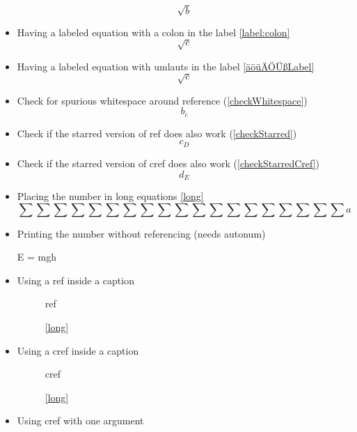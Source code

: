 \documentclass{article}
\begin{document}
\begin{itemize}
			\begin{equation}\label{äöüÄÖÜß?:, 3075µ!/§}
				\sqrt{b}
			\end{equation}
		\item Having a labeled equation with a colon in the label \ref{label:colon}
			\begin{equation}\label{label:colon}
				\sqrt{c}
			\end{equation}
		\item Having a labeled equation with umlauts in the label \ref{äöüÄÖÜßLabel}
			\begin{equation}\label{äöüÄÖÜßLabel}
				\sqrt{c}
			\end{equation}
		\item Check for spurious whitespace around reference (\ref{checkWhitespace})
			\begin{equation}\label{checkWhitespace}
				b_c
			\end{equation}
		\item Check if the starred version of ref does also work (\ref*{checkStarred})
			\begin{equation}\label{checkStarred}
				c_D
			\end{equation}
		\item Check if the starred version of cref does also work (\cref*{checkStarredCref})
			\begin{equation}\label{checkStarredCref}
				d_E
			\end{equation}
		\item Placing the number in long equations \ref{long}
			\begin{equation}\label{long}
				\sum\sum\sum\sum\sum\sum\sum\sum\sum\sum\sum\sum\sum\sum\sum\sum\sum\sum\sum a
			\end{equation}
		\item Printing the number without referencing (needs autonum)
			\begin{equation+}
				E = mgh
			\end{equation+}
		\item Using a ref inside a caption
			\begin{figure}
				ref
				\caption{\ref{long}}
			\end{figure}
		\item Using a cref inside a caption
			\begin{figure}
				cref
				\caption{\cref{long}}
			\end{figure}
		\item Using cref with one argument
			\begin{equation}\label{crefOne}

\end{equation}
\end{itemize}
\end{document}
